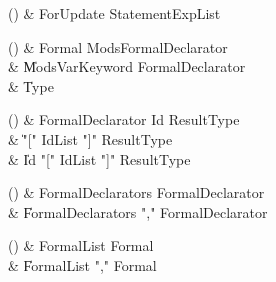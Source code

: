 \begin{bbgrammarappendix}

() & ForUpdate \label{prod:ForUpdate}  \: StatementExpList  \\


\end{bbgrammarappendix}

\begin{bbgrammarappendix}

() & Formal \label{prod:Formal}  \: Mods\opt FormalDeclarator  \\

 &    \| Mods\opt VarKeyword FormalDeclarator \\
 &    \| Type \\

\end{bbgrammarappendix}

\begin{bbgrammarappendix}

() & FormalDeclarator \label{prod:FormalDeclarator}  \: Id ResultType  \\

 &    \| \xcd"[" IdList \xcd"]" ResultType \\
 &    \| Id \xcd"[" IdList \xcd"]" ResultType \\

\end{bbgrammarappendix}

\begin{bbgrammarappendix}

() & FormalDeclarators \label{prod:FormalDeclarators}  \: FormalDeclarator  \\

 &    \| FormalDeclarators \xcd"," FormalDeclarator \\

\end{bbgrammarappendix}

\begin{bbgrammarappendix}

() & FormalList \label{prod:FormalList}  \: Formal  \\

 &    \| FormalList \xcd"," Formal \\

\end{bbgrammarappendix}

